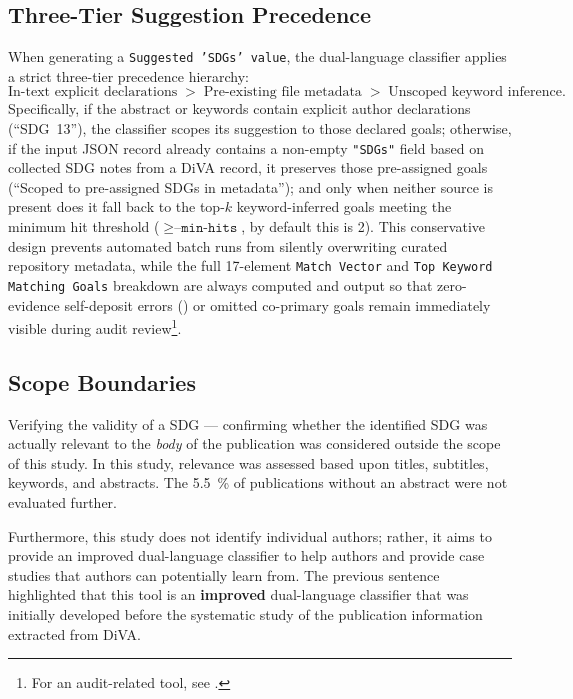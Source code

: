 \subsection{Three-Tier Suggestion Precedence}
\label{sec:threeTierSuggestionPrecedence}
When generating a \texttt{Suggested 'SDGs' value}, the dual-language classifier applies a strict three-tier precedence hierarchy:
\begin{equation*}
  \text{In-text explicit declarations} \;>\; \text{Pre-existing file metadata} \;>\; \text{Unscoped keyword inference}.
\end{equation*}
Specifically, if the abstract or keywords contain explicit author declarations (\eg \enquote{SDG~13}), the classifier scopes its suggestion to those declared goals; otherwise, if the input \gls{JSON} record already contains a non-empty \texttt{"SDGs"} field based on collected \gls{SDG} notes from a \gls{DiVA} record, it preserves those pre-assigned goals (\enquote{Scoped to pre-assigned SDGs in metadata}); and only when neither source is present does it fall back to the top-$k$ keyword-inferred goals meeting the minimum hit threshold ($\ge \texttt{--min-hits}$, by default this is \num{2}). This conservative design prevents automated batch runs from silently overwriting curated repository metadata, while the full 17-element \texttt{Match Vector} and \texttt{Top Keyword Matching Goals} breakdown are always computed and output so that zero-evidence self-deposit errors (\eg {}) or omitted co-primary goals remain immediately visible during audit review\footnote{For an audit-related tool, see .}.

\subsection{Scope Boundaries}
\label{sec:scope_boundaries}

Verifying the validity of a \gls{SDG} --- confirming whether the identified \gls{SDG} was actually relevant to the \textit{body} of the publication was considered outside the scope of this study. In this study, relevance was assessed based upon titles, subtitles, keywords, and abstracts. The \qty{5.5}{\percent} of publications without an abstract were not evaluated further.

Furthermore, this study does not identify individual authors; rather, it aims to \first provide an improved dual-language classifier to help authors and \Second provide case studies that authors can potentially learn from. The previous sentence highlighted that this tool is an \textbf{improved} dual-language classifier that was initially developed before the systematic study of the publication information extracted from \gls{DiVA}.

